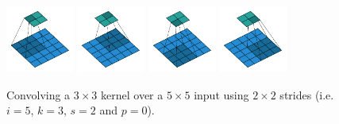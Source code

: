 \documentclass{article}
\begin{document}
\begin{figure}[t]
    \centering
    \includegraphics[width=0.2\textwidth]{pdf/no_padding_strides_00.pdf}
    \includegraphics[width=0.2\textwidth]{pdf/no_padding_strides_01.pdf}
    \includegraphics[width=0.2\textwidth]{pdf/no_padding_strides_02.pdf}
    \includegraphics[width=0.2\textwidth]{pdf/no_padding_strides_03.pdf}
    \caption{\label{fig:no_padding_strides} Convolving a $3 \times 3$
        kernel over a $5 \times 5$ input using $2 \times 2$ strides (i.e.
        $i = 5$, $k = 3$, $s = 2$ and $p = 0$).}
\end{figure}
\end{document}

